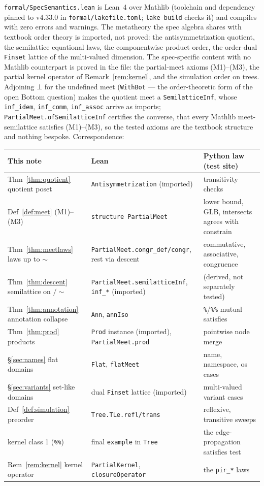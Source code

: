 \documentclass[11pt]{article}
\theoremstyle{definition}
\theoremstyle{remark}
\renewcommand{\ker}{\sim}
\newcommand{\code}[1]{\texttt{#1}}
\begin{document}
\code{formal/SpecSemantics.lean} is Lean~4 over Mathlib (toolchain and
dependency pinned to v4.33.0 in \code{formal/lakefile.toml}; \code{lake
build} checks it) and compiles with zero errors and warnings.  The
metatheory the spec algebra shares with textbook order theory is imported,
not proved: the antisymmetrization quotient, the semilattice equational
laws, the componentwise product order, the order-dual \code{Finset}
lattice of the multi-valued dimension.  The spec-specific content with no
Mathlib counterpart is proved in the file: the partial-meet axioms
(M1)--(M3), the partial kernel operator of Remark~\ref{rem:kernel}, and
the simulation order on trees.  Adjoining
$\bot$ for the undefined meet (\code{WithBot} --- the order-theoretic form
of the open Bottom question) makes the quotient meet a
\code{SemilatticeInf}, whose \code{inf\_idem}, \code{inf\_comm},
\code{inf\_assoc} arrive as imports; \code{PartialMeet.ofSemilatticeInf}
certifies the converse, that every Mathlib meet-semilattice satisfies
(M1)--(M3), so the tested axioms are the textbook structure and nothing
bespoke.  Correspondence:

\begin{center}
\small
\begin{tabular}{@{}llp{4.1cm}@{}}
\toprule
This note & Lean & Python law (test site) \\
\midrule
Thm~\ref{thm:quotient} quotient poset & \code{Antisymmetrization} (imported) & transitivity checks \\
Def~\ref{def:meet} (M1)--(M3) & \code{structure PartialMeet} & lower bound, GLB, intersects agrees with constrain \\
Thm~\ref{thm:meetlaws} laws up to $\ker$ & \code{PartialMeet.congr\_def/congr}, rest via descent & commutative, associative, congruence \\
Thm~\ref{thm:descent} semilattice on $/\!\ker$ & \code{PartialMeet.semilatticeInf}, \code{inf\_*} (imported) & (derived, not separately tested) \\
Thm~\ref{thm:annotation} annotation collapse & \code{Ann}, \code{annIso} & \code{\%}/\code{\%\%} mutual satisfies \\
Thm~\ref{thm:prod} products & \code{Prod} instance (imported), \code{PartialMeet.prod} & pointwise node merge \\
\S\ref{sec:names} flat domains & \code{Flat}, \code{flatMeet} & name, namespace, os cases \\
\S\ref{sec:variants} set-like domains & dual \code{Finset} lattice (imported) & multi-valued variant cases \\
Def~\ref{def:simulation} preorder & \code{Tree.TLe.refl/trans} & reflexive, transitive sweeps \\
kernel class 1 (\code{\%\%}) & final \code{example} in \code{Tree} & the edge-propagation satisfies test \\
Rem~\ref{rem:kernel} kernel operator & \code{PartialKernel}, \code{closureOperator} & the \code{pir\_*} laws \\
\bottomrule
\end{tabular}
\end{center}
\end{document}
